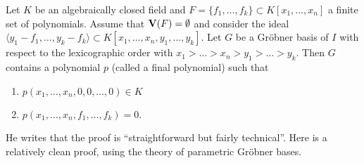 \begin{theorem}
  Let $K$ be an algebraically closed field and $F = \{f_{1}, \dots, f_{k}\} \subset K[x_{1}, \dots, x_{n}]$ a finite set of polynomials. Assume that $\operatorname{\mathbf V}(F) = \emptyset$ and consider the ideal $\langle y_{1} - f_{1}, \dots, y_{k} - f_{k} \rangle \subset K[x_{1}, \dots, x_{n}, y_{1}, \dots, y_{k}]$. Let $G$ be a Gröbner basis of $I$ with respect to the lexicographic order with $x_{1} > \dots > x_{n} > y_{1} > \dots > y_{k}$. Then $G$ contains a polynomial $p$ (called a final polynomial) such that
  \begin{enumerate}
    \item $p(x_{1}, \dots, x_{n}, 0, 0, \dots, 0) \in K$
    \item $p(x_{1}, \dots, x_{n}, f_{1}, \dots, f_{k}) = 0$.
  \end{enumerate}
\end{theorem}

He writes that the proof is ``straightforward but fairly technical''. Here is a relatively clean proof, using the theory of parametric Gröbner bases.

